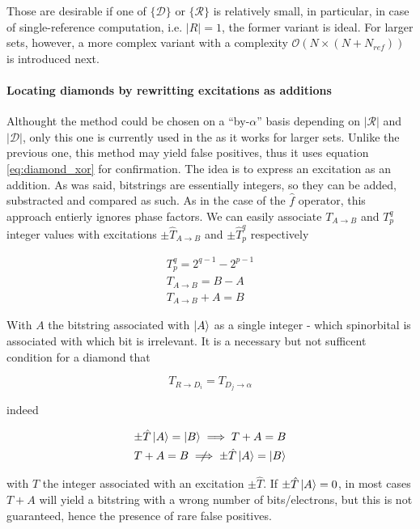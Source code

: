 \documentclass[./thesis.tex]{subfiles}
\begin{document}
Those are desirable if one of $\{\mathcal{D}\}$ or $\{\mathcal{R}\}$ is relatively small, in particular, in case of single-reference computation, i.e. $|R|=1$, the former variant is ideal. For larger sets, however, a more complex variant with a complexity $\mathcal{O}(N \times (N+N_{ref}))$ is introduced next.


\paragraph{Locating diamonds by rewritting excitations as additions}
Althought the method could be chosen on a ``by-$\alpha$'' basis depending on $|\mathcal{R}|$ and $|\mathcal{D}|$, only this one is currently used in the \QP as it works for larger sets.
Unlike the previous one, this method may yield false positives, thus it uses equation \ref{eq:diamond_xor} for confirmation.
The idea is to express an excitation as an addition. As was said, bitstrings are essentially integers, so they can be added, substracted and compared as such. As in the case of the $\hat f$ operator, this approach entierly ignores phase factors. We can easily associate $T_{A \rightarrow B}$ and $T_p^q$ integer values with  excitations $\pm \hat T_{A \rightarrow B}$ and $\pm \hat T_p^q$ respectively

\begin{align}
T_p^q = 2^{q-1} - 2^{p-1} \\
T_{A \rightarrow B} = B - A \\
T_{A \rightarrow B} + A = B 
\end{align}

With $A$ the bitstring associated with $\ket A$ as a single integer - which spinorbital is associated with which bit is irrelevant. It is a necessary but not sufficent condition for a diamond that

\begin{equation}
T_{R \rightarrow D_i} = T_{D_j \rightarrow \alpha}
\end{equation}

indeed 

\begin{align}
\pm \hat T \ket A = \ket B \implies  T + A = B\\
T + A = B \centernot \implies \pm \hat T \ket A = \ket B
\end{align}

with $T$ the integer associated with an excitation $\pm \hat T$. If $\pm \hat T \ket A = 0$, in most cases $T + A$ will yield a bitstring with a wrong number of bits/electrons, but this is not guaranteed, hence the presence of rare false positives.
\end{document}
